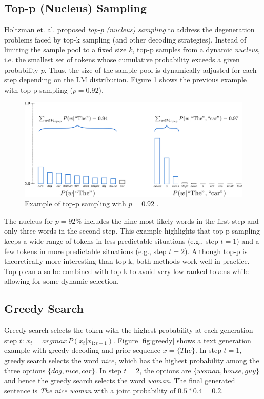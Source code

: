 \subsection{Top-p (Nucleus) Sampling}

Holtzman et. al. \cite{holtzman2019curious} proposed \textit{top-p (nucleus) sampling} to address the degeneration problems faced by top-k sampling (and other decoding strategies). Instead of limiting the sample pool to a fixed size $k$, top-p samples from a dynamic \textit{nucleus}, i.e. the smallest set of tokens whose cumulative probability exceeds a given probability $p$. Thus, the size of the sample pool is dynamically adjusted for each step depending on the LM distribution. Figure \ref{fig:topp} shows the previous example with top-p sampling ($p=0.92$).

\begin{figure}[!h]
 \centering
 \includegraphics[width=0.9\columnwidth]{imgs/background/topp.png}
 \caption{Example of top-p sampling with $p=0.92$ \cite{platen2020}.}
 \label{fig:topp}
\end{figure}

The nucleus for $p=92\%$ includes the nine most likely words in the first step and only three words in the second step. This example highlights that top-p sampling keeps a wide range of tokens in less predictable situations (e.g., step $t=1$) and a few tokens in more predictable situations (e.g., step $t=2$). Although top-p is theoretically more interesting than top-k, both methods work well in practice. Top-p can also be combined with top-k to avoid very low ranked tokens while allowing for some dynamic selection.

\subsection{Greedy Search}

Greedy search selects the token with the highest probability at each generation step $t$: $x_t = argmax \, P(x_t|x_{1:t-1})$. Figure \ref{fig:greedy} shows a text generation example with greedy decoding and prior sequence $x = \{\textit{The}\}$.
In step $t=1$, greedy search selects the word $\textit{nice}$, which has the highest probability among the three options $\{ \textit{dog}, \textit{nice}, \textit{car} \}$. In step $t=2$, the options are $\{ \textit{woman}, \textit{house}, \textit{guy} \}$ and hence the greedy search selects the word \textit{woman}. The final generated sentence is \textit{The nice woman} with a joint probability of $0.5*0.4=0.2$.

